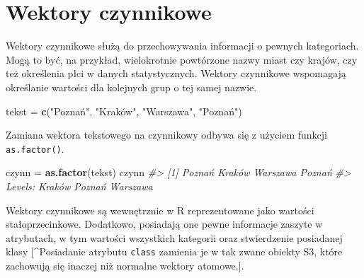\documentclass[paper=6in:9in,pagesize=pdftex,headinclude=on,footinclude=on,10pt]{scrbook}
\newenvironment{Shaded}{\begin{snugshade}}{\end{snugshade}}
\newcommand{\CommentTok}[1]{\textcolor[rgb]{0.56,0.35,0.01}{\textit{#1}}}
\newcommand{\KeywordTok}[1]{\textcolor[rgb]{0.13,0.29,0.53}{\textbf{#1}}}
\newcommand{\NormalTok}[1]{#1}
\newcommand{\StringTok}[1]{\textcolor[rgb]{0.31,0.60,0.02}{#1}}
\begin{document}
\hypertarget{fac}{%
\section{Wektory czynnikowe}\label{fac}}

Wektory czynnikowe służą do przechowywania informacji o pewnych kategoriach.
Mogą to być, na przykład, wielokrotnie powtórzone nazwy miast czy krajów, czy też określenia płci w danych statystycznych.
Wektory czynnikowe wspomagają określanie wartości dla kolejnych grup o tej samej nazwie.

\begin{Shaded}
\begin{Highlighting}[]
\NormalTok{tekst =}\StringTok{ }\KeywordTok{c}\NormalTok{(}\StringTok{"Poznań"}\NormalTok{, }\StringTok{"Kraków", "}\NormalTok{Warszawa}\StringTok{", "}\NormalTok{Poznań}\StringTok{")}
\end{Highlighting}
\end{Shaded}

Zamiana wektora tekstowego na czynnikowy odbywa się z użyciem funkcji \texttt{as.factor()}.

\begin{Shaded}
\begin{Highlighting}[]
\NormalTok{czynn =}\StringTok{ }\KeywordTok{as.factor}\NormalTok{(tekst)}
\NormalTok{czynn}
\CommentTok{#> [1] Poznań   Kraków   Warszawa Poznań  }
\CommentTok{#> Levels: Kraków Poznań Warszawa}
\end{Highlighting}
\end{Shaded}

Wektory czynnikowe są wewnętrznie w R reprezentowane jako wartości stałoprzecinkowe.
Dodatkowo, posiadają one pewne informacje zaszyte w atrybutach, w tym wartości wszystkich kategorii oraz stwierdzenie posiadanej klasy {[}\^{}Posiadanie atrybutu \texttt{class} zamienia je w tak zwane obiekty S3, które zachowują się inaczej niż normalne wektory atomowe.{]}.

\begin{Shaded}
\end{Shaded}
\end{document}

